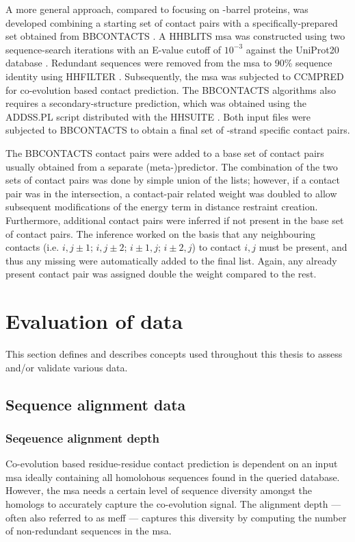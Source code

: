 A more general approach, compared to \cite{Hayat2015-ut} focusing on \textbeta-barrel proteins, was developed combining a starting set of contact pairs with a specifically-prepared set obtained from BBCONTACTS \cite{Andreani2015-qn}. A HHBLITS \cite{Remmert2011-kt} \gls{msa} was constructed using two sequence-search iterations with an E-value cutoff of $10^{-3}$ against the UniProt20 database \cite{Bateman2017-pb}. Redundant sequences were removed from the \gls{msa} to 90\% sequence identity using HHFILTER \cite{Remmert2011-kt}. Subsequently, the \gls{msa} was subjected to CCMPRED \cite{Seemayer2014-zp} for co-evolution based contact prediction. The BBCONTACTS algorithms also requires a secondary-structure prediction, which was obtained using the ADDSS.PL script \cite{Remmert2011-kt} distributed with the HHSUITE \cite{Soding2005-hw}. Both input files were subjected to BBCONTACTS to obtain a final set of \textbeta-strand specific contact pairs.

The BBCONTACTS contact pairs were added to a base set of contact pairs usually obtained from a separate (meta-)predictor. The combination of the two sets of contact pairs was done by simple union of the lists; however, if a contact pair was in the intersection, a contact-pair related weight was doubled to allow subsequent modifications of the energy term in distance restraint creation. Furthermore, additional contact pairs were inferred if not present in the base set of contact pairs. The inference worked on the basis that any neighbouring contacts (i.e. $i,j\pm1$; $i,j\pm2$; $i\pm  1,j$; $i\pm2,j$) to contact $i,j$ must be present, and thus any missing were automatically added to the final list. Again, any already present contact pair was assigned double the weight compared to the rest.

\section{Evaluation of data}
This section defines and describes concepts used throughout this thesis to assess and/or validate various data. 
\subsection{Sequence alignment data}
\subsubsection{Seqeuence alignment depth}
Co-evolution based residue-residue contact prediction is dependent on an input \gls{msa} ideally containing all homolohous sequences found in the queried database. However, the \gls{msa} needs a certain level of sequence diversity amongst the homologs to accurately capture the co-evolution signal. The alignment depth --- often also referred to as \gls{meff} --- captures this diversity by computing the number of non-redundant sequences in the \gls{msa}.

